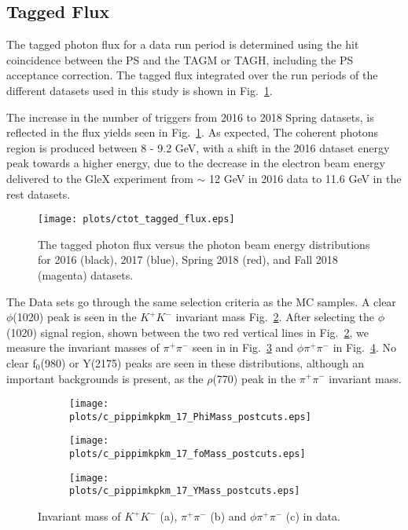 \subsection{Tagged Flux}

The tagged photon flux for a data run period is determined using the hit coincidence between the PS and the TAGM or TAGH, including the PS acceptance correction. The tagged flux integrated over the run periods of the different datasets used in this study is shown in Fig.~\ref{fig.4.2.2}.
~\par The increase in the number of triggers from 2016 to 2018 Spring datasets, is reflected in the flux yields seen in Fig.~\ref{fig.4.2.2}. As expected, The coherent photons region is produced between 8 - 9.2 GeV, with a shift in the 2016 dataset energy peak towards a higher energy, due to the decrease in the electron beam energy delivered to the GleX experiment from $\sim$ 12 GeV in 2016 data to 11.6 GeV in the rest datasets.

\begin{figure}[H]
    \centering
    \texttt{[image: plots/ctot\_tagged\_flux.eps]}
    \caption{\label{fig.4.2.2}The tagged photon flux versus the photon beam energy distributions for 2016 (black), 2017 (blue), Spring 2018 (red), and Fall 2018 (magenta) datasets.}
\end{figure}

The Data sets go through the same selection criteria as the MC samples. A clear $\phi$(1020) peak is seen in the $K^+K^-$ invariant mass Fig.~\ref{fig.4.4.1.a}. After selecting the $\phi$(1020) signal region, shown between the two red vertical lines in Fig.~\ref{fig.4.4.1.a}, we measure the invariant masses of $\pi^+ \pi^-$ seen in in Fig.~\ref{fig.4.4.1.b} and $\phi \pi^+ \pi^-$ in Fig.~\ref{fig.4.4.1.c}. No clear f$_0$(980) or Y(2175) peaks are seen in these distributions, although an important backgrounds is present, as the $\rho$(770) peak in the $\pi^+ \pi^-$ invariant mass.

\begin{figure}[H]
    \centering
    \begin{subfigure}[b]{0.45\textwidth}
        \texttt{[image: plots/c\_pippimkpkm\_17\_PhiMass\_postcuts.eps]}
        \caption{}
        \label{fig.4.4.1.a}
    \end{subfigure}
    \begin{subfigure}[b]{0.45\textwidth}
        \texttt{[image: plots/c\_pippimkpkm\_17\_foMass\_postcuts.eps]}
        \caption{}
        \label{fig.4.4.1.b}
    \end{subfigure}
    \begin{subfigure}[b]{0.45\textwidth}
        \texttt{[image: plots/c\_pippimkpkm\_17\_YMass\_postcuts.eps]}
        \caption{}
        \label{fig.4.4.1.c}
    \end{subfigure}
    \caption{Invariant mass of $K^+K^-$ (a), $\pi^+\pi^-$ (b) and $\phi \pi^+ \pi^-$ (c) in data.}
    \label{fig:4.4.1}
\end{figure}

